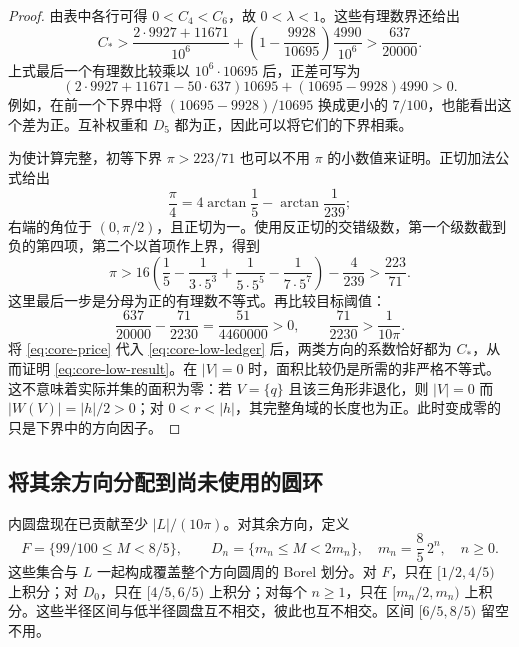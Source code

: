 \begin{proof}
由表中各行可得 $0<C_4<C_6$，故 $0<\lambda<1$。这些有理数界还给出
\[
 C_*>
 \frac{2\cdot9927+11671}{10^6}
 +\left(1-\frac{9928}{10695}\right)\frac{4990}{10^6}
 >\frac{637}{20000}.
\]
上式最后一个有理数比较乘以 $10^6\cdot10695$ 后，正差可写为
\[
 (2\cdot9927+11671-50\cdot637)10695
                         +(10695-9928)4990>0.
\]
例如，在前一个下界中将 $(10695-9928)/10695$ 换成更小的 $7/100$，也能看出这个差为正。互补权重和 $D_5$ 都为正，因此可以将它们的下界相乘。

为使计算完整，初等下界 $\pi>223/71$ 也可以不用 $\pi$ 的小数值来证明。正切加法公式给出
\[
 \frac\pi4=4\arctan\frac15-\arctan\frac1{239};
\]
右端的角位于 $(0,\pi/2)$，且正切为一。使用反正切的交错级数，第一个级数截到负的第四项，第二个以首项作上界，得到
\[
 \pi>
 16\left(\frac15-\frac1{3\cdot5^3}
                  +\frac1{5\cdot5^5}-\frac1{7\cdot5^7}\right)
          -\frac4{239}>\frac{223}{71}.
\]
这里最后一步是分母为正的有理数不等式。再比较目标阈值：
\[
 \frac{637}{20000}-\frac{71}{2230}=\frac{51}{4460000}>0,
 \qquad \frac{71}{2230}>\frac1{10\pi}.
\]
将 \eqref{eq:core-price} 代入 \eqref{eq:core-low-ledger} 后，两类方向的系数恰好都为 $C_*$，从而证明 \eqref{eq:core-low-result}。在 $|V|=0$ 时，面积比较仍是所需的非严格不等式。这不意味着实际并集的面积为零：若 $V=\{q\}$ 且该三角形非退化，则 $|V|=0$ 而 $|W(V)|=|h|/2>0$；对 $0<r<|h|$，其完整角域的长度也为正。此时变成零的只是下界中的方向因子。
\end{proof}

\subsection{将其余方向分配到尚未使用的圆环}
\label{subsec:core-high}

内圆盘现在已贡献至少 $|L|/(10\pi)$。对其余方向，定义
\begin{equation}
 F=\{99/100\leq M<8/5\},\qquad
 D_n=\{m_n\leq M<2m_n\},\quad
 m_n=\frac85\,2^n,\quad n\geq0.
\label{eq:core-partition}
\end{equation}
这些集合与 $L$ 一起构成覆盖整个方向圆周的 Borel 划分。对 $F$，只在 $[1/2,4/5)$ 上积分；对 $D_0$，只在 $[4/5,6/5)$ 上积分；对每个 $n\geq1$，只在 $[m_n/2,m_n)$ 上积分。这些半径区间与低半径圆盘互不相交，彼此也互不相交。区间 $[6/5,8/5)$ 留空不用。

